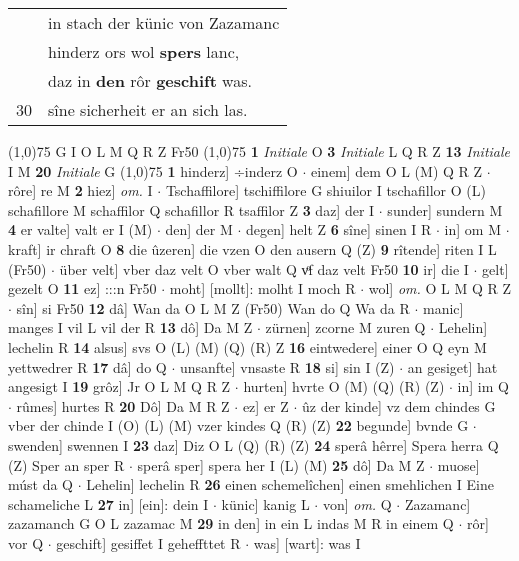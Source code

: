 \documentclass[8pt,a4paper,notitlepage]{article}
\begin{document}
\begin{table}[ht]
\begin{minipage}[t]{0.5\linewidth}
\begin{tabular}{rl}
 & in stach der künic von Zazamanc\\ 
 & hinderz ors wol \textbf{spers} lanc,\\ 
 & daz in \textbf{den} rôr \textbf{geschift} was.\\ 
30 & sîne sicherheit er an sich las.\\ 
\end{tabular}
\scriptsize
\line(1,0){75} \newline
G I O L M Q R Z Fr50 \newline
\line(1,0){75} \newline
\textbf{1} \textit{Initiale} O  \textbf{3} \textit{Initiale} L Q R Z  \textbf{13} \textit{Initiale} I M  \textbf{20} \textit{Initiale} G  \newline
\line(1,0){75} \newline
\textbf{1} hinderz] ÷inderz O  $\cdot$ einem] dem O L (M) Q R Z  $\cdot$ rôre] re M \textbf{2} hiez] \textit{om.} I  $\cdot$ Tschaffilore] tschiffilore G shiuilor I tschafillor O (L) schafillore M schaffilor Q schafillor R tsaffilor Z \textbf{3} daz] der I  $\cdot$ sunder] sundern M \textbf{4} er valte] valt er I (M)  $\cdot$ den] der M  $\cdot$ degen] helt Z \textbf{6} sîne] sinen I R  $\cdot$ in] om M  $\cdot$ kraft] ir chraft O \textbf{8} die ûzeren] die vzen O den ausern Q (Z) \textbf{9} rîtende] riten I L (Fr50)  $\cdot$ über velt] vber daz velt O vber walt Q vͦf daz velt Fr50 \textbf{10} ir] die I  $\cdot$ gelt] gezelt O \textbf{11} ez] :::n Fr50  $\cdot$ moht] [mollt]: molht I moch R  $\cdot$ wol] \textit{om.} O L M Q R Z  $\cdot$ sîn] si Fr50 \textbf{12} dâ] Wan da O L M Z (Fr50) Wan do Q Wa da R  $\cdot$ manic] manges I vil L vil der R \textbf{13} dô] Da M Z  $\cdot$ zürnen] zcorne M zuren Q  $\cdot$ Lehelin] lechelin R \textbf{14} alsus] svs O (L) (M) (Q) (R) Z \textbf{16} eintwedere] einer O Q eyn M yettwedrer R \textbf{17} dâ] do Q  $\cdot$ unsanfte] vnsaste R \textbf{18} si] sin I (Z)  $\cdot$ an gesiget] hat angesigt I \textbf{19} grôz] Jr O L M Q R Z  $\cdot$ hurten] hvrte O (M) (Q) (R) (Z)  $\cdot$ in] im Q  $\cdot$ rûmes] hurtes R \textbf{20} Dô] Da M R Z  $\cdot$ ez] er Z  $\cdot$ ûz der kinde] vz dem chindes G vber der chinde I (O) (L) (M) vzer kindes Q (R) (Z) \textbf{22} begunde] bvnde G  $\cdot$ swenden] swennen I \textbf{23} daz] Diz O L (Q) (R) (Z) \textbf{24} sperâ hêrre] Spera herra Q (Z) Sper an sper R  $\cdot$ sperâ sper] spera her I (L) (M) \textbf{25} dô] Da M Z  $\cdot$ muose] múst da Q  $\cdot$ Lehelin] lechelin R \textbf{26} einen schemelîchen] einen smehlichen I Eine schameliche L \textbf{27} in] [ein]: dein I  $\cdot$ künic] kanig L  $\cdot$ von] \textit{om.} Q  $\cdot$ Zazamanc] zazamanch G O L zazamac M \textbf{29} in den] in ein L indas M R in einem Q  $\cdot$ rôr] vor Q  $\cdot$ geschift] gesiffet I geheffttet R  $\cdot$ was] [wart]: was I \newline

\end{minipage}
\end{table}
\end{document}
